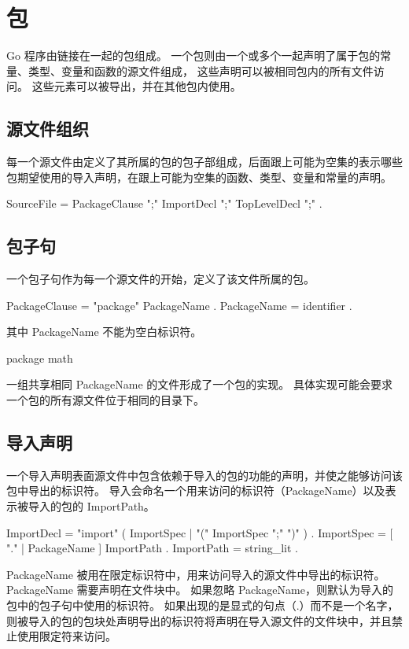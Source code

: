 \chapter{包} \label{ch:packages}
Go 程序由链接在一起的包组成。
一个包则由一个或多个一起声明了属于包的常量、类型、变量和函数的源文件组成，
这些声明可以被相同包内的所有文件访问。
这些元素可以被导出，并在其他包内使用。

\section{源文件组织}
每一个源文件由定义了其所属的包的包子部组成，后面跟上可能为空集的表示哪些包期望使用的导入声明，在跟上可能为空集的函数、类型、变量和常量的声明。
\begin{EBNF}
SourceFile       = PackageClause ";" { ImportDecl ";" } { TopLevelDecl ";" } .
\end{EBNF}

\section{包子句}
一个包子句作为每一个源文件的开始，定义了该文件所属的包。
\begin{EBNF}
PackageClause  = "package" PackageName .
PackageName    = identifier .
\end{EBNF}
其中 PackageName 不能为空白标识符。
\begin{golang}
package math
\end{golang}

一组共享相同 PackageName 的文件形成了一个包的实现。
具体实现可能会要求一个包的所有源文件位于相同的目录下。

\section{导入声明}
一个导入声明表面源文件中包含依赖于导入的包的功能的声明，并使之能够访问该包中导出的标识符。
导入会命名一个用来访问的标识符（PackageName）以及表示被导入的包的 ImportPath。
\begin{EBNF}
ImportDecl       = "import" ( ImportSpec | "(" { ImportSpec ";" } ")" ) .
ImportSpec       = [ "." | PackageName ] ImportPath .
ImportPath       = string_lit .
\end{EBNF}

PackageName 被用在限定标识符中，用来访问导入的源文件中导出的标识符。
PackageName 需要声明在文件块中。
如果忽略 PackageName，则默认为导入的包中的包子句中使用的标识符。
如果出现的是显式的句点（.）而不是一个名字，则被导入的包的包块处声明导出的标识符将声明在导入源文件的文件块中，并且禁止使用限定符来访问。

